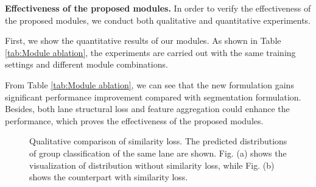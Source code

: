 \documentclass[runningheads]{llncs}
\begin{document}
\noindent
\textbf{Effectiveness of the proposed modules.} In order to verify the effectiveness of the proposed modules, we conduct both qualitative and quantitative experiments. 

First, we show the quantitative results of our modules. As shown in Table \ref{tab:Module ablation}, the experiments are carried out with the same training settings and different module combinations. 



\begin{table}[h]
	\centering
	\caption{Experiments of the proposed modules on Tusimple benchmark with Resnet-34 backbone. Baseline stands for conventional segmentation formulation.}
	\label{tab:Module ablation}
\end{table}

From Table \ref{tab:Module ablation}, we can see that the new formulation gains significant performance improvement compared with segmentation formulation. Besides, both lane structural loss and feature aggregation could enhance the performance, which proves the effectiveness of the proposed modules. 

\begin{figure}[h]
	
	\centering
	\caption{Qualitative comparison of similarity loss. The predicted distributions of group classification of the same lane are shown. Fig. (a) shows the visualization of distribution without similarity loss, while Fig. (b) shows the counterpart with similarity loss.}
	\label{fig_col_test}
	\vspace{-10pt}
\end{figure}
\end{document}
